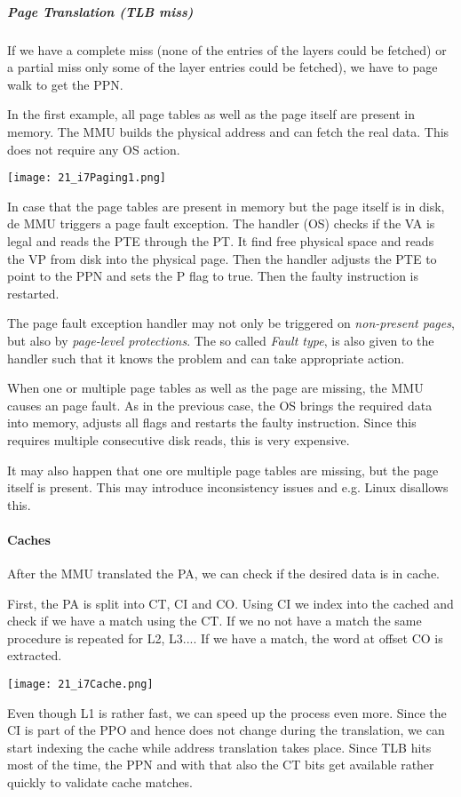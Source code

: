 \subparagraph{Page Translation (TLB miss)}
If we have a complete miss (none of the entries of the layers could be fetched) or a partial miss only some of the layer entries could be fetched), we have to page walk to get the PPN.

In the first example, all page tables as well as the page itself are present in memory. The MMU builds the physical address and can fetch the real data. This does not require any OS action.

\texttt{[image: 21\_i7Paging1.png]}

In case that the page tables are present in memory but the page itself is in disk, de MMU triggers a page fault exception. The handler (OS) checks if the VA is legal and reads the PTE through the PT. It find free physical space and reads the VP from disk into the physical page. Then the handler adjusts the PTE to point to the PPN and sets the P flag to true. Then the faulty instruction is restarted.

The page fault exception handler may not only be triggered on \textit{non-present pages}, but also by \textit{page-level protections}. The so called \textit{Fault type}, is also given to the handler such that it knows the problem and can take appropriate action.

When one or multiple page tables as well as the page are missing, the MMU causes an page fault. As in the previous case, the OS brings the required data into memory, adjusts all flags and restarts the faulty instruction. Since this requires multiple consecutive disk reads, this is very expensive.

It may also happen that one ore multiple page tables are missing, but the page itself is present. This may introduce inconsistency issues and e.g. Linux disallows this.

\paragraph{Caches}
After the MMU translated the PA, we can check if the desired data is in cache.

First, the PA is split into CT, CI and CO. Using CI we index into the cached and check if we have a match using the CT. If we no not have a match the same procedure is repeated for L2, L3.... If we have a match, the word at offset CO is extracted.

\texttt{[image: 21\_i7Cache.png]}

Even though L1 is rather fast, we can speed up the process even more. Since the CI is part of the PPO and hence does not change during the translation, we can start indexing the cache while address translation takes place. Since TLB hits most of the time, the PPN and with that also the CT bits get available rather quickly to validate cache matches.

